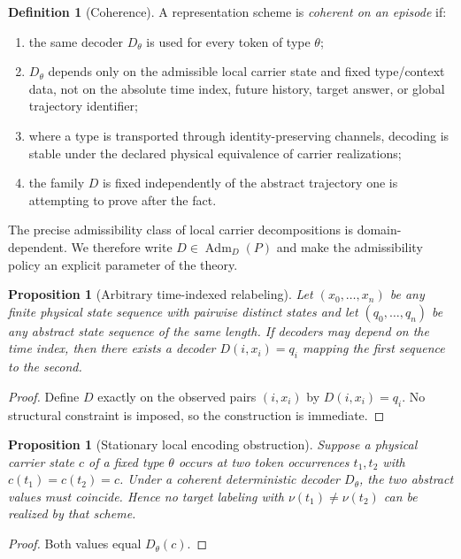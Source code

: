 \documentclass[11pt,a4paper]{article}
\theoremstyle{clean}
\newtheorem{proposition}[theorem]{Proposition}
\theoremstyle{definition}
\newtheorem{definition}[theorem]{Definition}
\newcommand{\Adm}{\operatorname{Adm}}
\begin{document}
\begin{definition}[Coherence]
A representation scheme is \emph{coherent on an episode} if:
\begin{enumerate}
  \item the same decoder $D_\theta$ is used for every token of type $\theta$;
  \item $D_\theta$ depends only on the admissible local carrier state and fixed type/context data, not on the absolute time index, future history, target answer, or global trajectory identifier;
  \item where a type is transported through identity-preserving channels, decoding is stable under the declared physical equivalence of carrier realizations;
  \item the family $D$ is fixed independently of the abstract trajectory one is attempting to prove after the fact.
\end{enumerate}
\end{definition}

The precise admissibility class of local carrier decompositions is domain-dependent. We therefore write $D\in\Adm_D(P)$ and make the admissibility policy an explicit parameter of the theory.

\begin{proposition}[Arbitrary time-indexed relabeling]
Let $(x_0,\dots,x_n)$ be any finite physical state sequence with pairwise distinct states and let $(q_0,\dots,q_n)$ be any abstract state sequence of the same length. If decoders may depend on the time index, then there exists a decoder $D(i,x_i)=q_i$ mapping the first sequence to the second.
\end{proposition}
\begin{proof}
Define $D$ exactly on the observed pairs $(i,x_i)$ by $D(i,x_i)=q_i$. No structural constraint is imposed, so the construction is immediate.
\end{proof}

\begin{proposition}[Stationary local encoding obstruction]
Suppose a physical carrier state $c$ of a fixed type $\theta$ occurs at two token occurrences $t_1,t_2$ with $c(t_1)=c(t_2)=c$. Under a coherent deterministic decoder $D_\theta$, the two abstract values must coincide. Hence no target labeling with $\nu(t_1)\neq \nu(t_2)$ can be realized by that scheme.
\end{proposition}
\begin{proof}
Both values equal $D_\theta(c)$.
\end{proof}
\end{document}
